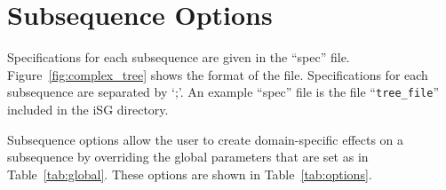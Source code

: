 \documentclass[10pt]{article}
\begin{document}
\section{Subsequence Options}
\label{sec:options}

Specifications for each subsequence are given in the ``spec'' file.  
Figure~\ref{fig:complex_tree} shows the format of the file. Specifications for each
subsequence are separated by `;'. An example ``spec'' file is the file ``{\tt tree\_file}''
included in the iSG directory.

Subsequence options allow the user to create domain-specific effects on a subsequence by 
overriding the global parameters that are set as in Table~\ref{tab:global}.  These options are 
shown in Table~\ref{tab:options}.

\begin{small}


\end{small}
\end{document}
